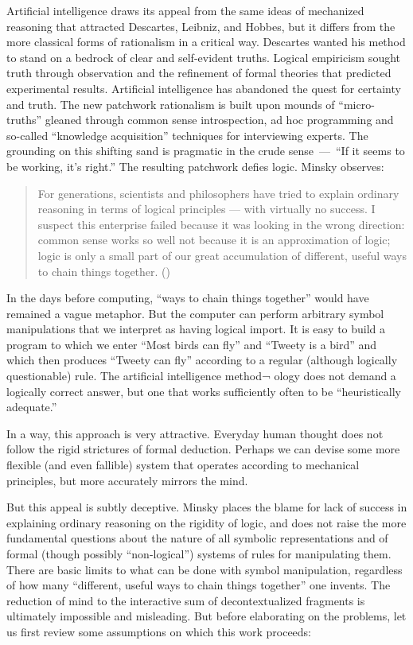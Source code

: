 \documentclass[12pt]{article}
\def\bq{\begin{quote}}
\def\eq{\end{quote}}
\begin{document}
Artificial intelligence draws its appeal from the same ideas of mechanized reasoning that attracted Descartes, Leibniz, and Hobbes, but it differs from the more classical forms of rationalism in a critical way. Descartes wanted his method to stand on a bedrock of clear and self-evident truths. Logical empiricism sought truth through observation and the refinement of formal theories that predicted experimental results. Artificial intelligence has abandoned the quest for certainty and truth. The new patchwork rationalism is built upon mounds of ``micro-truths'' gleaned through common sense introspection, ad hoc programming and so-called ``knowledge acquisition'' techniques for interviewing experts. The grounding on this shifting sand is pragmatic in the crude sense~---~``If it seems to be working, it's right.'' The resulting patchwork defies logic. Minsky observes:

\bq
For generations, scientists and philosophers have tried to explain ordinary reasoning in terms of logical principles --- with virtually no success. I suspect this enterprise failed because it was looking in the wrong direction: common sense works so well not because it is an approximation of logic; logic is only a small part of our great accumulation of different, useful ways to chain things together. ({\it \cite{minsky1986}})
\eq

In the days before computing, ``ways to chain things together'' would have remained a vague metaphor. But the computer can perform arbitrary symbol manipulations that we interpret as having logical import. It is easy to build a program to which we enter ``Most birds can fly'' and ``Tweety is a bird'' and which then produces ``Tweety can fly'' according to a regular (although logically questionable) rule. The artificial intelligence method¬ ology does not demand a logically correct answer, but one that works sufficiently often to be ``heuristically adequate.''

In a way, this approach is very attractive. Everyday human thought does not follow the rigid strictures of formal deduction. Perhaps we can devise some more flexible (and even fallible) system that operates according to mechanical principles, but more accurately mirrors the mind.

But this appeal is subtly deceptive. Minsky places the blame for lack of success in explaining ordinary reasoning on the rigidity of logic, and does not raise the more fundamental questions about the nature of all symbolic representations and of formal (though possibly ``non-logical'') systems of rules for manipulating them. There are basic limits to what can be done with symbol manipulation, regardless of how many ``different, useful ways to chain things together'' one invents. The reduction of mind to the interactive sum of decontextualized fragments is ultimately impossible and misleading. But before elaborating on the problems, let us first review some assumptions on which this work proceeds:
\end{document}
